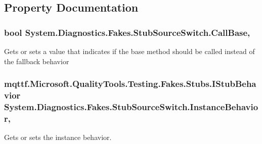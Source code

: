\subsection{Property Documentation}
\hypertarget{class_system_1_1_diagnostics_1_1_fakes_1_1_stub_source_switch_af81b88f29ac70b3bac444dd1c91b19c2}{
\subsubsection[{Call\-Base}]{\setlength{\rightskip}{0pt plus 5cm}bool System.\-Diagnostics.\-Fakes.\-Stub\-Source\-Switch.\-Call\-Base\hspace{0.3cm}{\ttfamily [get]}, {\ttfamily [set]}}}\label{class_system_1_1_diagnostics_1_1_fakes_1_1_stub_source_switch_af81b88f29ac70b3bac444dd1c91b19c2}


Gets or sets a value that indicates if the base method should be called instead of the fallback behavior

\hypertarget{class_system_1_1_diagnostics_1_1_fakes_1_1_stub_source_switch_a939bac8163a66c5b204156feb950e1cd}{
\subsubsection[{Instance\-Behavior}]{\setlength{\rightskip}{0pt plus 5cm}mqttf.\-Microsoft.\-Quality\-Tools.\-Testing.\-Fakes.\-Stubs.\-I\-Stub\-Behavior System.\-Diagnostics.\-Fakes.\-Stub\-Source\-Switch.\-Instance\-Behavior\hspace{0.3cm}{\ttfamily [get]}, {\ttfamily [set]}}}\label{class_system_1_1_diagnostics_1_1_fakes_1_1_stub_source_switch_a939bac8163a66c5b204156feb950e1cd}


Gets or sets the instance behavior.

